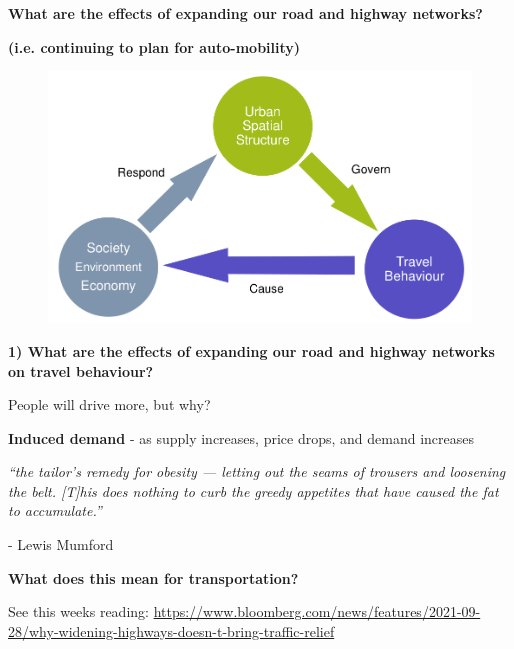 \documentclass[aspectratio=169]{beamer}
\begin{document}
\begin{frame}
	
	\textbf{What are the effects of expanding our road and highway networks?} 
			
	\textbf{(i.e. continuing to plan for auto-mobility)}
	
	\begin{figure}
		\centering
		\includegraphics[width=0.79\linewidth]{images/big_links.png}
	\end{figure}
	
\end{frame}


\begin{frame}
	
	\textbf{1) What are the effects of expanding our road and highway networks on travel behaviour?}
	
	\vspace{4mm}
	
	People will drive more, but why?
	

	
\end{frame}






\begin{frame}

	\textbf{Induced demand} - as supply increases, price drops, and demand increases 
	
	\vspace{2mm}
	
	\textit{“the tailor’s remedy for obesity — letting out the seams of trousers and loosening the belt. [T]his does nothing to curb the greedy appetites that have caused the fat to accumulate.”}
	
	- Lewis Mumford
	
	\vspace{4mm}
	
	\textbf{What does this mean for transportation?}
	
	
	\vspace{8mm}
	
	
	\small See this weeks reading: \url{https://www.bloomberg.com/news/features/2021-09-28/why-widening-highways-doesn-t-bring-traffic-relief}


\end{frame}
\end{document}
